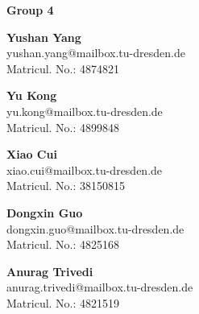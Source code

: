 \vspace*{\fill}
\begin{center}
\Large{\textbf{Group 4}}\\

\vspace{10mm}

\normalsize{
\textbf{Yushan Yang}\\
yushan.yang@mailbox.tu-dresden.de\\
Matricul. No.: 4874821\\

\vspace{5mm}

\textbf{Yu Kong}\\
yu.kong@mailbox.tu-dresden.de\\
Matricul. No.: 4899848\\

\vspace{5mm}

\textbf{Xiao Cui}\\
xiao.cui@mailbox.tu-dresden.de\\
Matricul. No.: 38150815\\			

\vspace{5mm}

\textbf{Dongxin Guo}\\
dongxin.guo@mailbox.tu-dresden.de\\
Matricul. No.: 4825168\\			

\vspace{5mm}

\textbf{Anurag Trivedi}\\
anurag.trivedi@mailbox.tu-dresden.de\\
Matricul. No.: 4821519 \\
}							
\end{center}
\vfill
